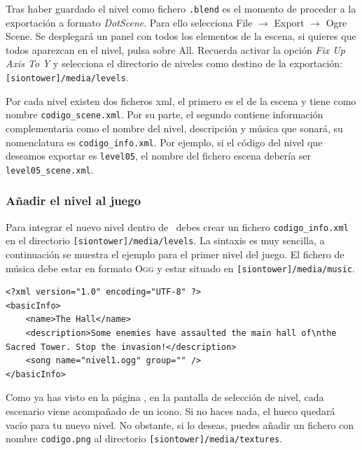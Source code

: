 \documentclass[a4paper,11pt]{article}
\begin{document}
Tras haber guardado el nivel como fichero \texttt{.blend} es el momento
de proceder a la exportación a formato \textit{DotScene}. Para ello selecciona
File $\rightarrow$ Export $\rightarrow$ Ogre Scene. Se desplegará un panel
con todos los elementos de la escena, si quieres que todos aparezcan
en el nivel, pulsa sobre All. Recuerda activar la opción \textit{Fix Up Axis
To Y} y selecciona el directorio de niveles como destino de la exportación:
\texttt{[siontower]/media/levels}.


Por cada nivel existen dos ficheros xml, el primero es el de la escena
y tiene como nombre \texttt{codigo\_scene.xml}. Por su parte, el segundo
contiene información complementaria como el nombre del nivel, descripción
y música que sonará, su nomenclatura es \texttt{codigo\_info.xml}. Por ejemplo,
si el código del nivel que deseamos exportar es \texttt{level05}, el nombre
del fichero escena debería ser \texttt{level05\_scene.xml}.

\subsubsection{Añadir el nivel al juego}

Para integrar el nuevo nivel dentro de \juego\ debes crear un fichero
\texttt{codigo\_info.xml} en el directorio \texttt{[siontower]/media/levels}.
La sintaxis es muy sencilla, a continuación se muestra el ejemplo para
el primer nivel del juego. El fichero de música debe estar en formato \textsc{Ogg}
y estar situado en \texttt{[siontower]/media/music}.

\begin{lstlisting}[style=xml]
<?xml version="1.0" encoding="UTF-8" ?>
<basicInfo>
    <name>The Hall</name>
    <description>Some enemies have assaulted the main hall of\nthe Sacred Tower. Stop the invasion!</description>
    <song name="nivel1.ogg" group="" />
</basicInfo>
\end{lstlisting}

Como ya has visto en la página \pageref{sec:levelselection}, en la pantalla
de selección de nivel, cada escenario viene acompañado de un icono. Si no
haces nada, el hueco quedará vacío para tu nuevo nivel. No obstante, si lo deseas,
puedes añadir un fichero con nombre \texttt{codigo.png} al directorio
\texttt{[siontower]/media/textures}.
\end{document}
